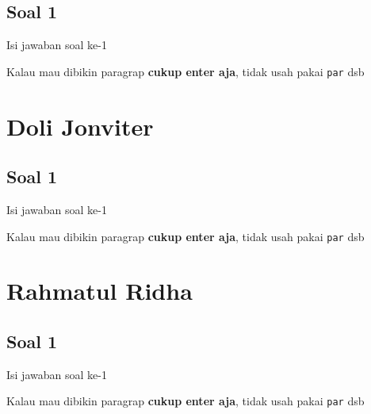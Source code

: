 \subsection{Soal 1}
Isi jawaban soal ke-1

Kalau mau dibikin paragrap \textbf{cukup enter aja}, tidak usah pakai \verb|par| dsb



\section{Doli Jonviter}
\subsection{Soal 1}
Isi jawaban soal ke-1

Kalau mau dibikin paragrap \textbf{cukup enter aja}, tidak usah pakai \verb|par| dsb



\section{Rahmatul Ridha}
\subsection{Soal 1}
Isi jawaban soal ke-1

Kalau mau dibikin paragrap \textbf{cukup enter aja}, tidak usah pakai \verb|par| dsb


